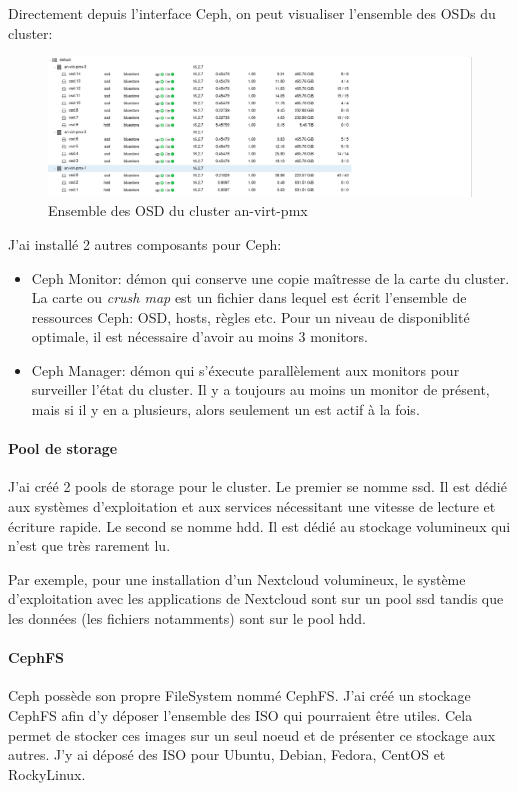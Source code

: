 \documentclass[12pt]{article}
\begin{document}
Directement depuis l'interface Ceph, on peut visualiser l'ensemble des OSDs du cluster:
\begin{figure}
    \centering
        \includegraphics[width=\textwidth]{src/osd_cluster.png}
    \caption{Ensemble des OSD du cluster an-virt-pmx}
    \label{fig:osd_cluster}
\end{figure}

J'ai installé 2 autres composants pour Ceph:
\begin{itemize}
    \item Ceph Monitor: démon qui conserve une copie maîtresse de la carte du cluster. 
    La carte ou \textit{crush map} est un fichier dans lequel est écrit l'ensemble de ressources Ceph: OSD, hosts, règles etc.
    Pour un niveau de disponiblité optimale, il est nécessaire d'avoir au moins 3 monitors.
    \item Ceph Manager: démon qui s'éxecute parallèlement aux monitors pour surveiller l'état du cluster.
    Il y a toujours au moins un monitor de présent, mais si il y en a plusieurs, alors seulement un est actif à la fois.
\end{itemize}

\paragraph{Pool de storage}
J'ai créé 2 pools de storage pour le cluster.
Le premier se nomme ssd. 
Il est dédié aux systèmes d'exploitation et aux services nécessitant une vitesse de lecture et écriture rapide.
Le second se nomme hdd.
Il est dédié au stockage volumineux qui n'est que très rarement lu.

Par exemple, pour une installation d'un Nextcloud volumineux, le système d'exploitation avec les applications de Nextcloud sont sur un pool ssd tandis que les données (les fichiers notamments) sont sur le pool hdd.

\paragraph{CephFS}
Ceph possède son propre FileSystem nommé CephFS.
J'ai créé un stockage CephFS afin d'y déposer l'ensemble des ISO qui pourraient être utiles.
Cela permet de stocker ces images sur un seul noeud et de présenter ce stockage aux autres.
J'y ai déposé des ISO pour Ubuntu, Debian, Fedora, CentOS et RockyLinux.
\end{document}
